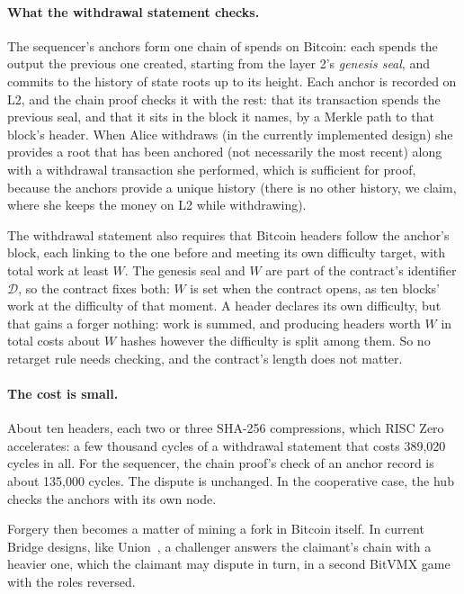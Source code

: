 \documentclass[11pt]{article}
\begin{document}
\paragraph{What the withdrawal statement checks.} The sequencer's
anchors form one chain of spends on Bitcoin: each spends the output the
previous one created, starting from the layer 2's \emph{genesis seal},
and commits to the history of state roots up to its height. Each anchor
is recorded on L2, and the chain proof
checks it with the rest: that its transaction spends the previous seal, and
that it sits in the block it names, by a Merkle path to that block's
header. 
When Alice withdraws (in the currently implemented design) she provides a root that has been anchored (not necessarily the most recent) along with a withdrawal transaction she performed, which is sufficient for proof, because the anchors provide a unique history (there is no other history, we claim, where she keeps the money on L2 while withdrawing).

The withdrawal
statement also requires that Bitcoin headers follow the anchor's block, each
linking to the one before and meeting its own difficulty target, with
total work at least $W$. The genesis seal and $W$ are part of the
contract's identifier $\mathcal{D}$, so the contract fixes both: $W$
is set when the contract opens, as ten blocks' work at the difficulty of
that moment. A header declares its own difficulty, but that gains a
forger nothing: work is summed, and producing headers worth $W$ in total
costs about $W$ hashes however the difficulty is split among them. So
no retarget rule needs checking, and the contract's length does not
matter.

\paragraph{The cost is small.} About ten headers, each two or three
SHA-256 compressions, which RISC Zero accelerates: a few thousand cycles
of a withdrawal statement that costs 389,020 cycles in all. For the
sequencer, the chain proof's check of an anchor record is about 135,000
cycles. The dispute is unchanged. In the cooperative case, the hub
checks the anchors with its own node.

Forgery then becomes a matter of mining a fork in Bitcoin itself. In current Bridge designs, like Union~\cite{union}, a challenger answers the claimant's chain with a
heavier one, which the claimant may dispute in turn, in a second BitVMX
game with the roles reversed.
\end{document}
